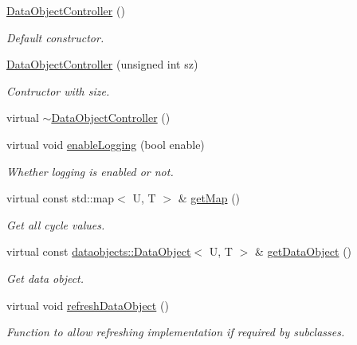 \begin{DoxyCompactItemize}
\item 
\hyperlink{classcryomesh_1_1dataobjects_1_1DataObjectController_a9b5dd38c83c6fb1dc5bcf4ddcbc7a577}{\-Data\-Object\-Controller} ()
\begin{DoxyCompactList}\small\item\em \-Default constructor. \end{DoxyCompactList}\item 
\hyperlink{classcryomesh_1_1dataobjects_1_1DataObjectController_a01e98fc9bc0f3495bd05e01e6cc15f29}{\-Data\-Object\-Controller} (unsigned int sz)
\begin{DoxyCompactList}\small\item\em \-Contructor with size. \end{DoxyCompactList}\item 
virtual \hyperlink{classcryomesh_1_1dataobjects_1_1DataObjectController_aa023e2b5199e935b52781a8556d97cbe}{$\sim$\-Data\-Object\-Controller} ()
\item 
virtual void \hyperlink{classcryomesh_1_1dataobjects_1_1DataObjectController_a3e510413675407ec0a6745345ca9a3a8}{enable\-Logging} (bool enable)
\begin{DoxyCompactList}\small\item\em \-Whether logging is enabled or not. \end{DoxyCompactList}\item 
virtual const std\-::map$<$ \-U, \-T $>$ \& \hyperlink{classcryomesh_1_1dataobjects_1_1DataObjectController_a70a03ee28392ecf2e039702a18511f05}{get\-Map} ()
\begin{DoxyCompactList}\small\item\em \-Get all cycle values. \end{DoxyCompactList}\item 
virtual const \*
\hyperlink{classcryomesh_1_1dataobjects_1_1DataObject}{dataobjects\-::\-Data\-Object}$<$ \-U, \-T $>$ \& \hyperlink{classcryomesh_1_1dataobjects_1_1DataObjectController_aa919e8676a611028c6b6e6791c87f438}{get\-Data\-Object} ()
\begin{DoxyCompactList}\small\item\em \-Get data object. \end{DoxyCompactList}\item 
virtual void \hyperlink{classcryomesh_1_1dataobjects_1_1DataObjectController_ae015efe3d10cced82d5043f560cbe04f}{refresh\-Data\-Object} ()
\begin{DoxyCompactList}\small\item\em \-Function to allow refreshing implementation if required by subclasses. \end{DoxyCompactList}\end{DoxyCompactItemize}
